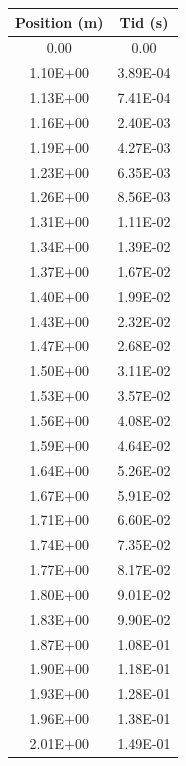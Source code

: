\documentclass[11p, titlepage, oneside, a4paper]{article}
\begin{document}
    \begin{table}
            \begin{center}
            \begin{tabular}{ |c|c| }
            \hline
            Position (m) & Tid (s)  \\
            \hline
                0.00 & 0.00 \\
                1.10E+00 & 3.89E-04 \\
                1.13E+00 & 7.41E-04 \\
                1.16E+00 & 2.40E-03 \\
                1.19E+00 & 4.27E-03 \\
                1.23E+00 & 6.35E-03 \\
                1.26E+00 & 8.56E-03 \\
                1.31E+00 & 1.11E-02 \\
                1.34E+00 & 1.39E-02 \\
                1.37E+00 & 1.67E-02 \\
                1.40E+00 & 1.99E-02 \\
                1.43E+00 & 2.32E-02 \\
                1.47E+00 & 2.68E-02 \\
                1.50E+00 & 3.11E-02 \\
                1.53E+00 & 3.57E-02 \\
                1.56E+00 & 4.08E-02 \\
                1.59E+00 & 4.64E-02 \\
                1.64E+00 & 5.26E-02 \\
                1.67E+00 & 5.91E-02 \\
                1.71E+00 & 6.60E-02 \\
                1.74E+00 & 7.35E-02 \\
                1.77E+00 & 8.17E-02 \\
                1.80E+00 & 9.01E-02 \\
                1.83E+00 & 9.90E-02 \\
                1.87E+00 & 1.08E-01 \\
                1.90E+00 & 1.18E-01 \\
                1.93E+00 & 1.28E-01 \\
                1.96E+00 & 1.38E-01 \\
                2.01E+00 & 1.49E-01 \\

\end{tabular}
\end{center}
\end{table}
\end{document}
